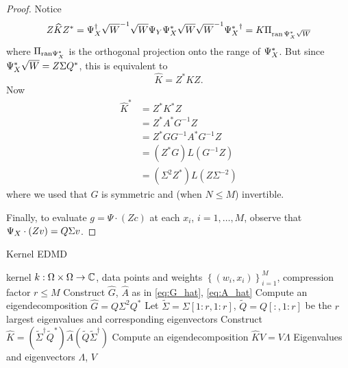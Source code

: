 \begin{proof}
    Notice
    \begin{equation}
        Z \widehat{ K } Z^* 
        = \YX^\dagger \sqrt{W}^{-1} \sqrt{W} \YY \YX^* \sqrt{W} \sqrt{W}^{-1} {\YX^*}^\dagger%
        = K \Pi_{\ran\, \YX^* \sqrt{W}}
    \end{equation}
    where $\Pi_{\text{ran} \Psi_X^*}$ is the orthogonal projection onto the range of $\Psi_X^*$. 
    But since $\Psi_X^* \sqrt{W} = Z \Sigma Q^*$, this is equivalent to 
    \begin{equation}
        \label{eq:Z*_K_Z}
        \widehat{ K } = Z^* K Z . 
    \end{equation}
    Now 
    \begin{equation}
        \begin{split}
            \widehat{ K }^* &= Z^* K^* Z \\
            &= Z^* A^* G^{-1} Z \\
            &= Z^* G G^{-1} A^* G^{-1} Z \\
            &= \left( Z^* G \right) L \left( G^{-1} Z \right) \\
            &= \left( \Sigma^2 Z^* \right) L \left( Z \Sigma^{-2} \right)
        \end{split}
    \end{equation}
    where we used that $G$ is symmetric and (when $N \leq M$) invertible.  

    Finally, to evaluate $g = \Psi \cdot (Z c)$ at each $x_i$, $i = 1, \ldots, M$, 
    observe that $\Psi_X \cdot (Z v) = Q \Sigma v$. 
\end{proof}

\begin{algorithm}
    \caption{Kernel EDMD}
    \label{alg:kedmd}
    \begin{algorithmic}[1]
        \Require kernel $k : \Omega \times \Omega \to \mathbb{C}$, data points and weights 
            $\left\{ (w_i, x_i) \right\}_{i=1}^M$, compression factor $r \leq M$
        \State Construct $\widehat{G}$, $\widehat{A}$ as in \ref{eq:G_hat}, \ref{eq:A_hat}
        \State Compute an eigendecomposition $\widehat{G} = Q \Sigma^2 Q^*$
        \State Let $\widetilde{\Sigma} = \Sigma [1:r, 1:r]$, $\widetilde{Q} = Q [:, 1:r]$ be the 
            $r$ largest eigenvalues and corresponding eigenvectors
        \State Construct 
        $\widehat{K} = 
        \left( \widetilde{\Sigma}^\dagger \widetilde{Q}^* \right)
        \widehat{A}
        \left( \widetilde{Q} \widetilde{\Sigma}^\dagger \right)$
        \State Compute an eigendecomposition $\widehat{K} V = V \Lambda$
        \State \Return Eigenvalues and eigenvectors $\Lambda$, $V$
    \end{algorithmic}
\end{algorithm}

